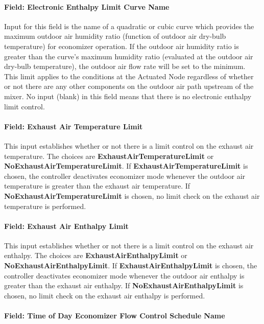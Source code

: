 \paragraph{Field: Electronic Enthalpy Limit Curve Name}\label{field-electronic-enthalpy-limit-curve-name-1}

Input for this field is the name of a quadratic or cubic curve which provides the maximum outdoor air humidity ratio (function of outdoor air dry-bulb temperature) for economizer operation. If the outdoor air humidity ratio is greater than the curve's maximum humidity ratio (evaluated at the outdoor air dry-bulb temperature), the outdoor air flow rate will be set to the minimum. This limit applies to the conditions at the Actuated Node regardless of whether or not there are any other components on the outdoor air path upstream of the mixer. No input (blank) in this field means that there is no electronic enthalpy limit control.

\paragraph{Field: Exhaust Air Temperature Limit}\label{field-exhaust-air-temperature-limit}

This input establishes whether or not there is a limit control on the exhaust air temperature. The choices are \textbf{ExhaustAirTemperatureLimit} or \textbf{NoExhaustAirTemperatureLimit}. If \textbf{ExhaustAirTemperatureLimit} is chosen, the controller deactivates economizer mode whenever the outdoor air temperature is greater than the exhaust air temperature. If \textbf{NoExhaustAirTemperatureLimit} is chosen, no limit check on the exhaust air temperature is performed.

\paragraph{Field: Exhaust Air Enthalpy Limit}\label{field-exhaust-air-enthalpy-limit}

This input establishes whether or not there is a limit control on the exhaust air enthalpy. The choices are \textbf{ExhaustAirEnthalpyLimit} or \textbf{NoExhaustAirEnthalpyLimit}. If \textbf{ExhaustAirEnthalpyLimit} is chosen, the controller deactivates economizer mode whenever the outdoor air enthalpy is greater than the exhaust air enthalpy. If \textbf{NoExhaustAirEnthalpyLimit} is chosen, no limit check on the exhaust air enthalpy is performed.

\paragraph{Field: Time of Day Economizer Flow Control Schedule Name}\label{field-time-of-day-economizer-flow-control-schedule-name}


